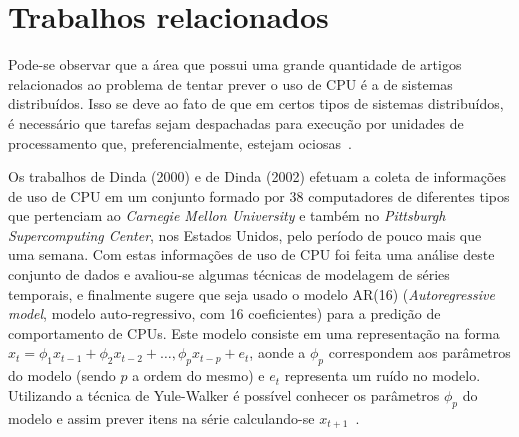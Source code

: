 %
%

\chapter{Trabalhos relacionados}

Pode-se observar que a área que possui uma grande quantidade de artigos
relacionados ao problema de tentar prever o uso de CPU é a de sistemas
distribuídos. Isso se deve ao fato de que em certos tipos de sistemas
distribuídos, é necessário que tarefas sejam despachadas para execução por
unidades de processamento que, preferencialmente, estejam ociosas~\cite{zhang2007cpu}.

Os trabalhos de Dinda (2000)\nocite{dinda2000host} e de Dinda
(2002)\nocite{dinda2002evaluation} efetuam a coleta de informações de uso de
CPU em um conjunto formado por 38 computadores de diferentes tipos que
pertenciam ao \emph{Carnegie Mellon University} e também no \emph{Pittsburgh
Supercomputing Center}, nos Estados Unidos, pelo período de pouco mais que uma
semana. Com estas informações de uso de CPU foi feita uma análise deste conjunto
de dados e avaliou-se algumas técnicas de modelagem de séries temporais, e
finalmente sugere que seja usado o modelo AR(16) (\emph{Autoregressive model},
modelo auto-regressivo, com 16 coeficientes) para a predição de comportamento
de CPUs. Este modelo consiste em uma representação na forma
$x_t = \phi_{1}x_{t-1} + \phi_{2}x_{t-2}+\dotsc,\phi_{p}x_{t-p}+e_t$, aonde a
$\phi_p$ correspondem aos parâmetros do modelo (sendo $p$ a ordem do mesmo) e
$e_t$ representa um ruído no modelo. Utilizando a técnica de Yule-Walker é
possível conhecer os parâmetros $\phi_p$ do modelo e assim prever itens na
série calculando-se $x_{t+1}$~\cite{baddour2005autoregressive}.

